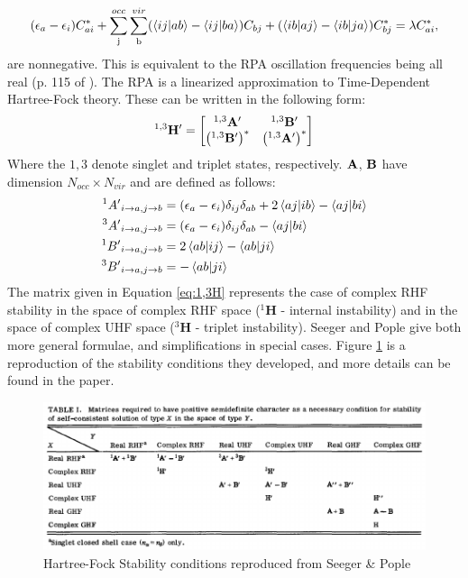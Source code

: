 \documentclass{revtex4}
\begin{document}
\begin{equation}
(\epsilon_a-\epsilon_i)C_{ai}^* + \sum\limits_{\text{j}}^{occ}\sum\limits_{\text{b}}^{vir}
	(\braket{ij|ab}-\braket{ij|ba})C_{bj}
	+(\braket{ib|aj}-\braket{ib|ja})C_{bj}^*
	=\lambda C_{ai}^*,
\end{equation}
are nonnegative. This is equivalent to the RPA oscillation frequencies being all real (p. 115 of \cite{Thouless1972}). The RPA is a linearized approximation to Time-Dependent Hartree-Fock theory. These can be written\cite{Dunning1967}\cite{Seeger1977} in the following form:
\begin{equation}\label{eq:1,3H}
{}^{1,3}\bf{H'}=
\begin{bmatrix}
{}^{1,3}\bf{A'} & {}^{1,3}\bf{B'} \\
\left({}^{1,3}\bf{B'}\right)^* & \left({}^{1,3}\bf{A'}\right)^* \\
\end{bmatrix}
\end{equation}
Where the $1,3$ denote singlet and triplet states, respectively. $\bf{A}$, $\bf{B}$ have dimension $N_{occ}\times N_{vir}$ and are defined as follows:
\begin{subequations}
	\begin{align}
	{}^{1}{A'}_{i\rightarrow a, j\rightarrow b} &= (\epsilon_a-\epsilon_i)\delta_{ij}\delta_{ab} + 2\braket{aj|ib}-\braket{aj|bi}\\
	{}^{3}{A'}_{i\rightarrow a, j\rightarrow b} &= (\epsilon_a-\epsilon_i)\delta_{ij}\delta_{ab} - \braket{aj|bi}\\
	{}^{1}{B'}_{i\rightarrow a, j\rightarrow b} &= 2\braket{ab|ij}-\braket{ab|ji}\\
	{}^{3}{B'}_{i\rightarrow a, j\rightarrow b} &= -\braket{ab|ji}
	\end{align}
\end{subequations}
The matrix given in Equation \ref{eq:1,3H} represents the case of complex RHF stability in the space of complex RHF space (${}^{1}\mathbf{H}$ - internal instability) and in the space of complex UHF space (${}^{3}\mathbf{H}$ - triplet instability). Seeger and Pople \cite{Seeger1977} give both more general formulae, and simplifications in special cases. Figure \ref{fig:stability_table} is a reproduction of the stability conditions they developed, and more details can be found in the paper. 
\begin{figure}[h]
   \includegraphics[width=1.0\linewidth]{figures/seeger_stability.pdf}
  	\caption {Hartree-Fock Stability conditions reproduced from Seeger \& Pople \cite{Seeger1977}}
  	\label{fig:stability_table}
\end{figure} 
\end{document}
